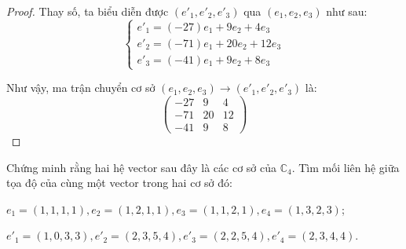 \begin{proof}
    Thay số, ta biểu diễn được $(e'_{1}, e'_{2}, e'_{3})$ qua $(e_{1}, e_{2}, e_{3})$ như sau:
    \[
        \begin{cases}
            e'_{1} = (-27)e_{1} + 9e_{2} + 4e_{3}   \\
            e'_{2} = (-71)e_{1} + 20e_{2} + 12e_{3} \\
            e'_{3} = (-41)e_{1} + 9e_{2} + 8e_{3}
        \end{cases}
    \]
    
    Như vậy, ma trận chuyển cơ sở $(e_{1}, e_{2}, e_{3}) \rightarrow (e'_{1}, e'_{2}, e'_{3})$ là:
    \[
        \begin{pmatrix}
            -27 & 9  & 4  \\
            -71 & 20 & 12 \\
            -41 & 9  & 8
        \end{pmatrix}
    \]
\end{proof}

\begin{exercise}
    Chứng minh rằng hai hệ vector sau đây là các cơ sở của $\mathbb{C}_{4}$. Tìm mối liên hệ giữa tọa độ của cùng một vector trong hai cơ sở đó:
    \par $e_{1} = (1, 1, 1, 1), e_{2} = (1, 2, 1, 1), e_{3} = (1, 1, 2, 1), e_{4} = (1, 3, 2, 3)$;
    \par $e'_{1} = (1, 0, 3, 3), e'_{2} = (2, 3, 5, 4), e'_{3} = (2, 2, 5, 4), e'_{4} = (2, 3, 4, 4)$.
\end{exercise}

